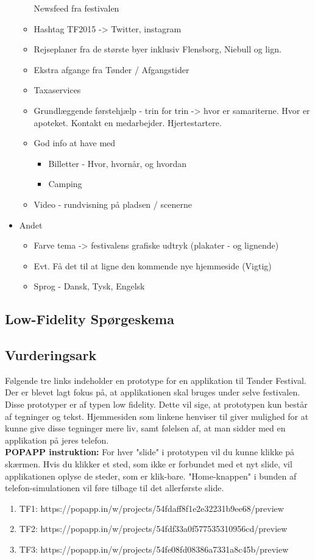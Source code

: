 \documentclass[a4paper,10pt,titlepage]{article}
\begin{document}
\begin{itemize}
\begin{itemize}
Newsfeed fra festivalen
\item
Hashtag TF2015 -> Twitter, instagram
\item
Rejseplaner fra de største byer inklusiv Flensborg, Niebull og lign.
\item
Ekstra afgange fra Tønder / Afgangstider 
\item
Taxaservices
\item
Grundlæggende førstehjælp - trin for trin -> hvor er samariterne. Hvor er apoteket. Kontakt en medarbejder. Hjertestartere.
\item
God info at have med
\begin{itemize}
\item
Billetter - Hvor, hvornår, og hvordan
\item
Camping
\end{itemize}
\item
Video - rundvisning på pladsen / scenerne
\end{itemize}
\item
Andet
\begin{itemize}
\item
Farve tema -> festivalens grafiske udtryk (plakater - og lignende)
\item
Evt. Få det til at ligne den kommende nye hjemmeside (Vigtig)
\item
Sprog - Dansk, Tysk, Engelsk
\end{itemize}
\end{itemize}
\newpage
\subsection{Low-Fidelity Spørgeskema}
\subsection*{Vurderingsark}
Følgende tre links indeholder en prototype for en applikation til Tønder Festival. Der er blevet lagt fokus på, at applikationen skal bruges under selve festivalen. Disse prototyper er af typen low fidelity. Dette vil sige, at prototypen kun består af tegninger og tekst. Hjemmesiden som linkene henviser til giver mulighed for at kunne give disse tegninger mere liv, samt følelsen af, at man sidder med en applikation på jeres telefon.\\

\textbf{POPAPP instruktion:} For hver "slide" i prototypen vil du kunne klikke på skærmen. Hvis du klikker et sted, som ikke er forbundet med et nyt slide, vil applikationen oplyse de steder, som er klik-bare. "Home-knappen" i bunden af telefon-simulationen vil føre tilbage til det allerførste slide.
\begin{enumerate}
\item
TF1: https://popapp.in/w/projects/54fdaff8f1e2e32231b9ee68/preview
\item
TF2: https://popapp.in/w/projects/54fdf33a0f577535310956cd/preview
\item
TF3: https://popapp.in/w/projects/54fe08fd08386a7331a8c45b/preview
\end{enumerate}
\end{document}
